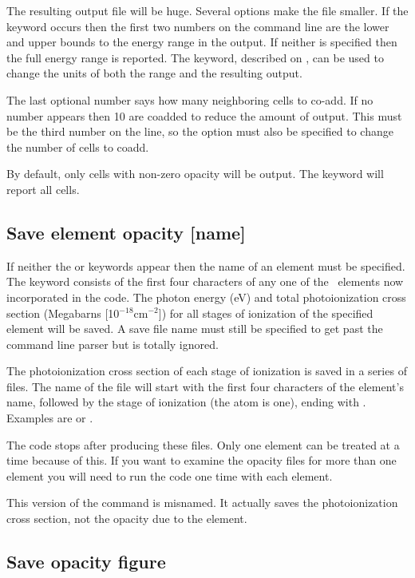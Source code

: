 The resulting output file
will be huge.  Several options make the file smaller.
If the keyword  occurs then the first two numbers on
the command line are the lower and upper bounds to the energy range in the
output.  If neither is specified then the full energy range is reported.
The  keyword, described on \pageref{output_units},
can be used to change the units of both the range and the resulting output.

The last optional number says how many neighboring cells to co-add.  If
no number appears then 10 are coadded to reduce the amount of output.
This must be the third number on the line, so the  option
must also be specified to change the number of cells to coadd.

By default, only cells with non-zero opacity will be output.  
The keyword  will report all cells.

\subsection{Save element opacity [name]}

If neither the  or  keywords appear then the name of an element must be specified.
The keyword consists of the first four characters of
any one of the \LIMELM\ elements now incorporated in the code.
The photon energy
(eV) and total photoionization cross section (Megabarns [10$^{-18}
\mathrm{cm}^{-2}$]) for
all stages of ionization of the specified element will be saved.
A save
file name must still be specified to get past the command line parser but
is totally ignored.

The photoionization cross section of each stage of ionization is saved
in a series of files.  The name of the file will start with the first four
characters of the element's name, followed by the stage of ionization (the
atom is one), ending with .  Examples are  or
.

The code stops after producing these files.
Only one element can be treated at a time because of this.
If you want to examine the opacity files for more than one element
you will need to run the code one time with each element.

This version of the  command is misnamed.
It actually saves the photoionization cross section, not the opacity due to the element.

\subsection{Save opacity figure}

